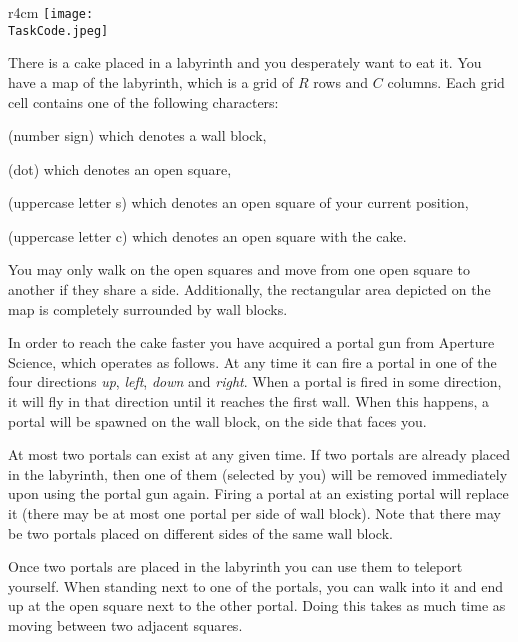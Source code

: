 \documentclass{boi2014}
\renewcommand{\TaskCode}{portals}
\newcommand{\constant}[1]{{\tt #1}}
\begin{document}
    \begin{wrapfigure}[4]{r}{4cm}
        \vspace{-24pt}
		\texttt{[image: \\TaskCode.jpeg]}
	\end{wrapfigure}

    There is a cake placed in a labyrinth and you desperately want to eat
    it. You have a map of the labyrinth, which is a grid of $R$ rows and $C$
    columns.  Each grid cell contains one of the following characters:
    \begin{description}[itemindent=1pt]
    	\item[\constant{\#}] (number sign) which denotes a wall block,
        \item[\constant{.}] (dot) which denotes an open square,
        \item[\constant{S}] (uppercase letter s) which denotes an open square of
        your current position,
        \item[\constant{C}] (uppercase letter c) which denotes an open square
        with the cake.
    \end{description}

    You may only walk on the open squares and move from one open square to
    another if they share a side. Additionally, the rectangular area depicted on
    the map is completely surrounded by wall blocks.

    In order to reach the cake faster you have acquired a portal gun from
    Aperture Science\texttrademark{}, which operates as follows.
    At any time it can fire a portal in one of the four directions
    \emph{up}, \emph{left}, \emph{down} and \emph{right}.
    When a portal is fired in some direction, it will fly in that direction
    until it reaches the first wall. When this happens, a portal
    will be spawned on the wall block, on the side that faces you.

    At most two portals can exist at any given time. If two portals are already
    placed in the labyrinth, then one of them (selected by you) will be removed
    immediately upon using the portal gun again. Firing a portal at an existing
    portal will replace it (there may be at
    most one portal per side of wall block).  Note that there may be two portals
    placed on different sides of the same wall block.

    Once two portals are placed in the labyrinth you can use them to
    teleport yourself. When standing next to one of the portals,
    you can walk into it and end up at the open square next to the other
    portal. Doing this takes as much time as moving between two
    adjacent squares.
\end{document}
